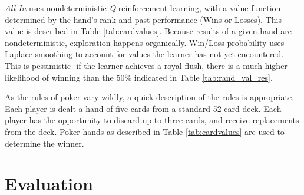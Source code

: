 \documentclass[12pt,pdftex]{article}
\begin{document}
\emph{All In} uses nondeterministic \emph{Q} reinforcement learning, with a value function determined by the hand's rank and past performance (Wins or Losses). This value is described in Table \ref{tab:cardvalues}. 
Because results of a given hand are nondeterministic, exploration happens organically. 
Win/Loss probability uses Laplace smoothing to account for values the learner has not yet encountered. This is pessimistic- if the learner achieves a royal flush, there is a much higher likelihood of winning than the 50\% indicated in Table \ref{tab:rand_val_res}. 

As the rules of poker vary wildly, a quick description of the rules is appropriate.
Each player is dealt a hand of five cards from a standard 52 card deck. 
Each player has the opportunity to discard up to three cards, and receive replacements from the deck.
Poker hands as described in Table \ref{tab:cardvalues} are used to determine the winner.


\section{Evaluation}

\end{document}
